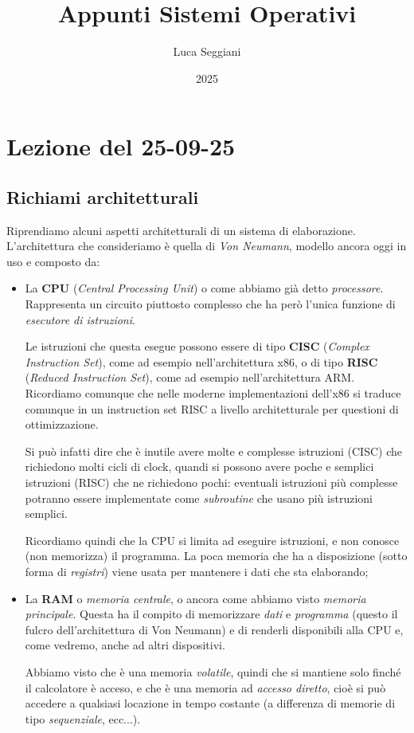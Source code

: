 \documentclass[a4paper,11pt]{article}
\title{Appunti Sistemi Operativi}
\author{Luca Seggiani}
\date{2025}
\begin{document}
\section{Lezione del 25-09-25}

\thispagestyle{empty}
\pagestyle{fancy}

\subsection{Richiami architetturali}
Riprendiamo alcuni aspetti architetturali di un sistema di elaborazione.
L'architettura che consideriamo è quella di \textit{Von Neumann}, modello ancora oggi in uso e composto da:
\begin{itemize}
	\item La \textbf{CPU} (\textit{Central Processing Unit}) o come abbiamo già detto \textit{processore}. Rappresenta un circuito piuttosto complesso che ha però l'unica funzione di \textit{esecutore di istruzioni}.

		Le istruzioni che questa esegue possono essere di tipo \textbf{CISC} (\textit{Complex Instruction Set}), come ad esempio nell'architettura x86, o di tipo \textbf{RISC} (\textit{Reduced Instruction Set}), come ad esempio nell'architettura ARM. Ricordiamo comunque che nelle moderne implementazioni dell'x86 si traduce comunque in un instruction set RISC a livello architetturale per questioni di ottimizzazione.

		Si può infatti dire che è inutile avere molte e complesse istruzioni (CISC) che richiedono molti cicli di clock, quandi si possono avere poche e semplici istruzioni (RISC) che ne richiedono pochi: eventuali istruzioni più complesse potranno essere implementate come \textit{subroutine} che usano più istruzioni semplici.

		Ricordiamo quindi che la CPU si limita ad eseguire istruzioni, e non conosce (non memorizza) il programma.
		La poca memoria che ha a disposizione (sotto forma di \textit{registri}) viene usata per mantenere i dati che sta elaborando;
	\item La \textbf{RAM} o \textit{memoria centrale}, o ancora come abbiamo visto \textit{memoria principale}. Questa ha il compito di memorizzare \textit{dati} e \textit{programma} (questo il fulcro dell'architettura di Von Neumann) e di renderli disponibili alla CPU e, come vedremo, anche ad altri dispositivi.

		Abbiamo visto che è una memoria \textit{volatile}, quindi che si mantiene solo finché il calcolatore è acceso, e che è una memoria ad \textit{accesso diretto}, cioè si può accedere a qualsiasi locazione in tempo costante (a differenza di memorie di tipo \textit{sequenziale}, ecc...).


\end{itemize}
\end{document}
